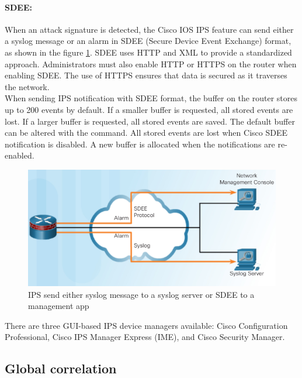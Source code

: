 \paragraph{SDEE:} When an attack signature is detected, the Cisco IOS IPS feature can send either a syslog message or an alarm in SDEE (Secure Device Event Exchange) format, as shown in the figure \ref{SDEE}. SDEE uses HTTP and XML to provide a standardized approach. Administrators must also enable HTTP or HTTPS on the router when enabling SDEE. The use of HTTPS ensures that data is secured as it traverses the network.\\

When sending IPS notification with SDEE format, the buffer on the router stores up to 200 events by default. If a smaller buffer is requested, all stored events are lost. If a larger buffer is requested, all stored events are saved. The default buffer can be altered with the  command. All stored events are lost when Cisco SDEE notification is disabled. A new buffer is allocated when the notifications are re-enabled.\\


\begin{figure}[hbtp]
\caption{IPS send either syslog message to a syslog server or SDEE to a management app}\label{SDEE}
\centering
\includegraphics[scale=0.7]{pictures/SDEE.PNG}
\end{figure}

There are three GUI-based IPS device managers available: Cisco Configuration Professional, Cisco IPS Manager Express (IME), and Cisco Security Manager.

\subsection{Global correlation}

